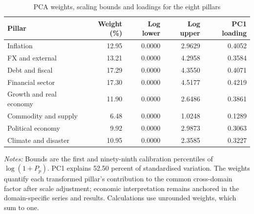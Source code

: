 \begin{table}[htbp]\centering\small\singlespacing
\caption{PCA weights, scaling bounds and loadings for the eight pillars}\label{tab:pillar_weights_full}
\setlength{\tabcolsep}{4pt}
\begin{tabular}{lrrrr}\toprule
Pillar & Weight (\%) & Log lower & Log upper & PC1 loading\\\midrule
Inflation & 12.95 & 0.0000 & 2.9629 & 0.4052\\
FX and external & 13.21 & 0.0000 & 4.2958 & 0.3584\\
Debt and fiscal & 17.29 & 0.0000 & 4.3550 & 0.4071\\
Financial sector & 17.30 & 0.0000 & 4.5177 & 0.4219\\
Growth and real economy & 11.90 & 0.0000 & 2.6486 & 0.3861\\
Commodity and supply & 6.48 & 0.0000 & 1.0248 & 0.1289\\
Political economy & 9.92 & 0.0000 & 2.9873 & 0.3063\\
Climate and disaster & 10.95 & 0.0000 & 2.3585 & 0.3227\\
\bottomrule\end{tabular}
\par\medskip\raggedright\footnotesize\textit{Notes:} Bounds are the first and ninety-ninth calibration percentiles of $\log(1+P_p)$. PC1 explains 52.50 percent of standardised variation. The weights quantify each transformed pillar's contribution to the common cross-domain factor after scale adjustment; economic interpretation remains anchored in the domain-specific series and results. Calculations use unrounded weights, which sum to one.
\end{table}